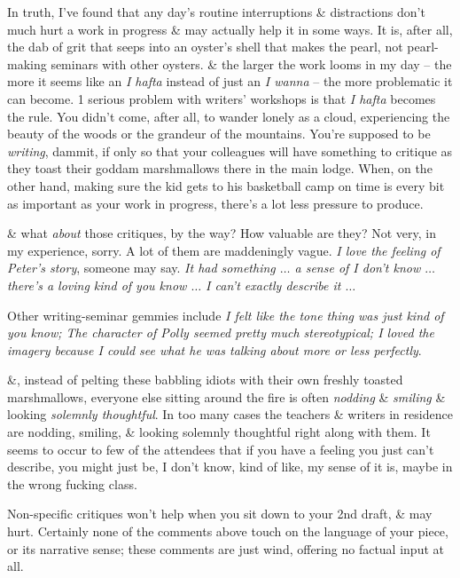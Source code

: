 \documentclass{article}
\numberwithin{equation}{section}
\begin{document}
In truth, I've found that any day's routine interruptions \& distractions don't much hurt a work in progress \& may actually help it in some ways. It is, after all, the dab of grit that seeps into an oyster's shell that makes the pearl, not pearl-making seminars with other oysters. \& the larger the work looms in my day -- the more it seems like an \textit{I hafta} instead of just an \textit{I wanna} -- the more problematic it can become. 1 serious problem with writers' workshops is that \textit{I hafta} becomes the rule. You didn't come, after all, to wander lonely as a cloud, experiencing the beauty of the woods or the grandeur of the mountains. You're supposed to be \textit{writing}, dammit, if only so that your colleagues will have something to critique as they toast their goddam marshmallows there in the main lodge. When, on the other hand, making sure the kid gets to his basketball camp on time is every bit as important as your work in progress, there's a lot less pressure to produce.

\& what \textit{about} those critiques, by the way? How valuable are they? Not very, in my experience, sorry. A lot of them are maddeningly vague. \textit{I love the feeling of Peter's story}, someone may say. \textit{It had something $\ldots$ a sense of I don't know $\ldots$ there's a loving kind of you know $\ldots$ I can't exactly describe it $\ldots$}

Other writing-seminar gemmies include \textit{I felt like the tone thing was just kind of you know; The character of Polly seemed pretty much stereotypical; I loved the imagery because I could see what he was talking about more or less perfectly}.

\&, instead of pelting these babbling idiots with their own freshly toasted marshmallows, everyone else sitting around the fire is often \textit{nodding} \& \textit{smiling} \& looking \textit{solemnly thoughtful}. In too many cases the teachers \& writers in residence are nodding, smiling, \& looking solemnly thoughtful right along with them. It seems to occur to few of the attendees that if you have a feeling you just can't describe, you might just be, I don't know, kind of like, my sense of it is, maybe in the wrong fucking class.

Non-specific critiques won't help when you sit down to your 2nd draft, \& may hurt. Certainly none of the comments above touch on the language of your piece, or its narrative sense; these comments are just wind, offering no factual input at all.
\end{document}
